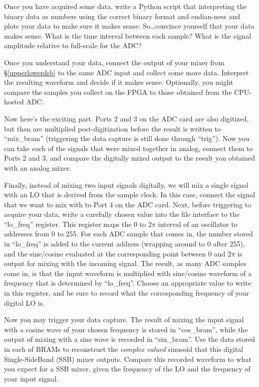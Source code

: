 \documentclass[11pt]{article}
\begin{document}
Once you have acquired some data, write a Python script that
interpreting the binary data as numbers using the correct binary format and endian-ness
and plots your data to make sure it makes sense.  So\dots convince yourself that your data
makes sense.  What is the time interval between each sample?  What is the signal amplitude
relative to full-scale for the ADC?

Once you understand your data, connect the output of your mixer from \S\ref{upperlowerdsb} to
the same ADC input and collect some more data.  Interpret the resulting waveform and decide if
it makes sense. Optionally, you might compare the samples you collect on the FPGA to those obtained from the CPU-hosted
ADC.  

Now here's the exciting part.  Ports 2 and 3 on the ADC card are also digitized, but then are multiplied
post-digitization before the result is written to ``mix\_bram'' (triggering the data capture is still
done through ``trig'').  Now you can take each of the signals
that were mixed together in analog, connect them to Ports 2 and 3, and compare the digitally mixed output
to the result you obtained with an analog mixer.

Finally, instead of mixing two input signals digitally, we will mix a single signal with an LO that is
derived from the sample clock.  In this case, connect the signal that we want to mix with to Port 4
on the ADC card.  Next, before triggering to acquire your data, write a carefully chosen value
into the file interface to the ``lo\_freq'' register.  This register maps the 0 to $2\pi$ interval
of an oscillator to addresses from 0 to 255.  For each ADC sample that comes in, the number stored
in ``lo\_freq'' is added to the current address (wrapping around to 0 after 255), and the sine/cosine
evaluated at the corresponding point between 0 and $2\pi$ is output for mixing with the incoming signal.
The result, as many ADC samples come in, is that the input waveform is multiplied with sine/cosine waveform
of a frequency that is determined by ``lo\_freq''.  Choose an appropriate value to write in this register,
and be sure to record what the corresponding frequency of your digital LO is.

Now you may trigger your data capture.  The result of mixing the input signal with a cosine wave of your
chosen frequency is stored in ``cos\_bram'', while the output of mixing with a sine wave is recorded
in ``sin\_bram''.  Use the data stored in each of BRAMs to reconstruct the {\it complex valued} sinusoid
that this digital Single-SideBand (SSB) mixer outputs.  Compare this recorded waveform to what you
expect for a SSB mixer, given the frequency of the LO and the frequency of your input signal.
\end{document}
